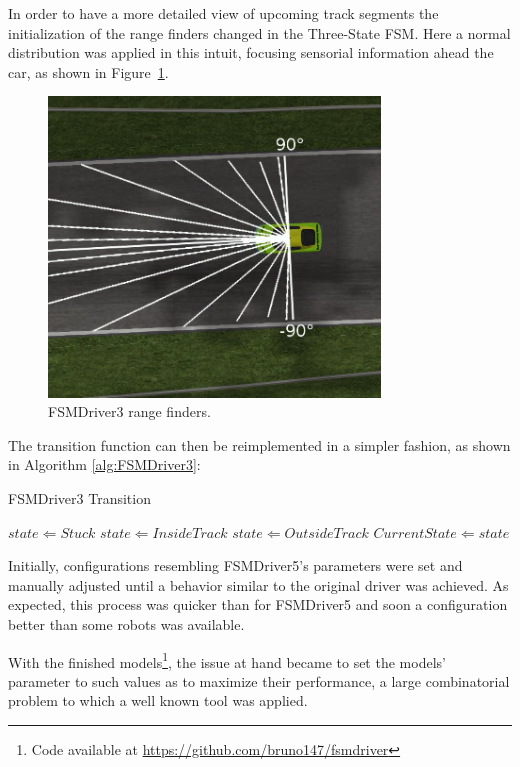 In order to have a more detailed view of upcoming track segments the initialization of the range finders changed in the Three-State FSM. Here a normal distribution was applied in this intuit, focusing sensorial information ahead the car, as shown in Figure~\ref{Fig:FSM3Sensors}.
\begin{figure}[h]
	\centering
	\includegraphics[width=250pt]{FSM3Sensors}
	\caption{FSMDriver3 range finders.}
	\label{Fig:FSM3Sensors}
\end{figure}

The transition function can then be reimplemented in a simpler fashion, as shown in Algorithm \ref{alg:FSMDriver3}:

\begin{algorithm}[h]%
\caption{FSMDriver3 Transition}%
\label{alg:FSMDriver3}%
\begin{algorithmic}
        \STATE $state \Leftarrow Stuck$
    \ELSE
            \STATE $state \Leftarrow Inside Track$
        \ELSE
            \STATE $state \Leftarrow Outside Track$
        \ENDIF
    \ENDIF
        \STATE $Current State \Leftarrow state$
    \ENDIF
\end{algorithmic}
\end{algorithm}

Initially, configurations resembling FSMDriver5's parameters were set and manually adjusted until a behavior similar to the original driver was achieved. As expected, this process was quicker than for FSMDriver5 and soon a configuration better than some robots was available.

With the finished models\footnote{Code available at \url{https://github.com/bruno147/fsmdriver}}, the issue at hand became to set the models' parameter to such values as to maximize their performance, a large combinatorial problem to which a well known tool was applied.

